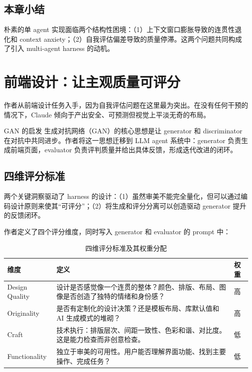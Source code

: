 \documentclass[a4paper]{article}
\begin{document}
\subsection{本章小结}

朴素的单 agent 实现面临两个结构性困境：（1）上下文窗口膨胀导致的连贯性退化和 context anxiety；（2）自我评估偏差导致的质量停滞。这两个问题共同构成了引入 multi-agent harness 的动机。

\section{前端设计：让主观质量可评分}

作者从前端设计任务入手，因为自我评估问题在这里最为突出。在没有任何干预的情况下，Claude 倾向于产出安全、可预测但视觉上平淡无奇的布局。

\begin{knowledgebox}{GAN 的启发}
生成对抗网络（GAN）的核心思想是让 generator 和 discriminator 在对抗中共同进步。作者将这一思想迁移到 LLM agent 系统中：generator 负责生成前端页面，evaluator 负责评判质量并给出具体反馈，形成迭代改进的闭环。
\end{knowledgebox}

\subsection{四维评分标准}

两个关键洞察驱动了 harness 的设计：（1）虽然审美不能完全量化，但可以通过编码设计原则来使其``可评分''；（2）将生成和评分分离可以创造驱动 generator 提升的反馈闭环。

作者定义了四个评分维度，同时写入 generator 和 evaluator 的 prompt 中：

\begin{table}[H]
\centering
\begin{tabular}{lp{9cm}l}
\toprule
\textbf{维度} & \textbf{定义} & \textbf{权重} \\
\midrule
Design Quality & 设计是否感觉像一个连贯的整体？颜色、排版、布局、图像是否创造了独特的情绪和身份感？ & 高 \\
Originality & 是否有定制化的设计决策？还是模板布局、库默认值和 AI 生成模式的堆砌？ & 高 \\
Craft & 技术执行：排版层次、间距一致性、色彩和谐、对比度。这是能力检查而非创意检查。 & 低 \\
Functionality & 独立于审美的可用性。用户能否理解界面功能、找到主要操作、完成任务？ & 低 \\
\bottomrule
\end{tabular}
\caption{四维评分标准及其权重分配}
\end{table}
\end{document}
